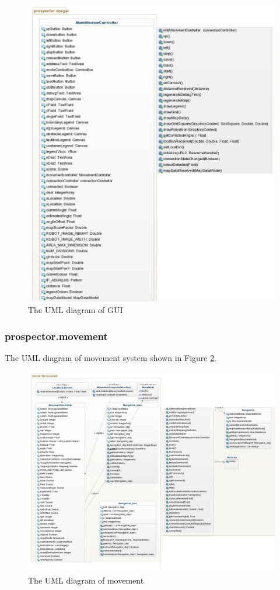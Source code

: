 \documentclass[12pt]{article}
\begin{document}
\begin{figure}[!htb]
\includegraphics[width=\textwidth]{opsgui.png}
\caption{The UML diagram of GUI}
  \label{fig:opsgui}
\end{figure}

\subsubsection{prospector.movement}
The UML diagram of movement system shown in Figure \ref{fig:movement}.

\begin{figure}[!htb]
\includegraphics[width=\textwidth]{movement.png}
\caption{The UML diagram of movement}
  \label{fig:movement}
\end{figure}
\end{document}
